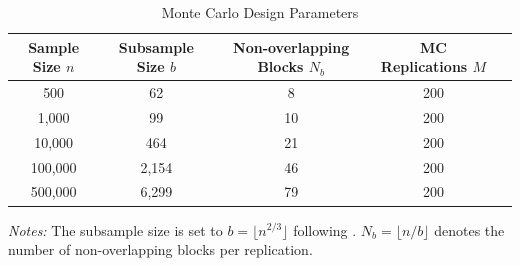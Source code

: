 \begin{table}[!h]
\centering
\caption{Monte Carlo Design Parameters}
\label{tab:mc_design}
\begin{tabular}{ccccc}
\toprule
Sample Size $n$ & Subsample Size $b$ & Non-overlapping Blocks $N_b$ & MC Replications $M$ \\
\midrule
500 & 62 & 8 & 200 \\
1{,}000 & 99 & 10 & 200 \\
10{,}000 & 464 & 21 & 200 \\
100{,}000 & 2{,}154 & 46 & 200 \\
500{,}000 & 6{,}299 & 79 & 200 \\
\bottomrule
\end{tabular}
\begin{flushleft}
\footnotesize\textit{Notes:} The subsample size is set to $b = \lfloor n^{2/3} \rfloor$ following \cite{PR99}.  $N_b = \lfloor n/b \rfloor$ denotes the number of non-overlapping blocks per replication.
\end{flushleft}
\end{table}


